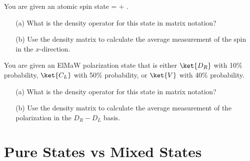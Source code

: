 \begin{exercise}
You are given an atomic spin state 
\beq
\ket{\Psi} =  + \ket{\ell}.
\eeq
\begin{enumerate}
\item[(a)] What is the density operator for this state in matrix notation?
\item[(b)] Use the density matrix to calculate the average measurement of the spin in the $x$-direction.
\end{enumerate}

\end{exercise}

\begin{exercise}
You are given an ElMaW polarization state that is either $\ket{D_R}$ with 10\% probability, $\ket{C_L}$ with 50\% probability, or $\ket{V}$ with 40\% probability. 

\begin{enumerate}
\item[(a)] What is the density operator for this state in matrix notation?
\item[(b)] Use the density matrix to calculate the average measurement of the polarization in the $D_R-D_L$ basis.
\end{enumerate}

\end{exercise}

\section{Pure States vs Mixed States}

